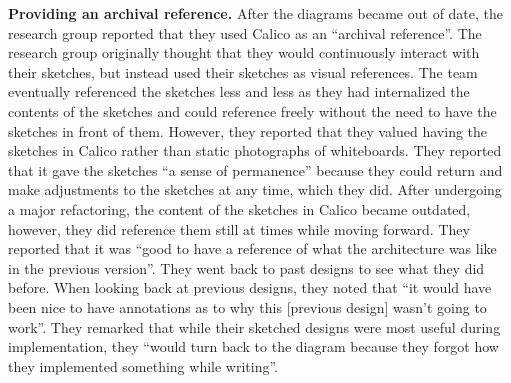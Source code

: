 
\textbf{Providing an archival reference.} After the diagrams became out of date, the research group reported that they used Calico as an ``archival reference''. The research group originally thought that they would continuously interact with their sketches, but instead used their sketches as visual references. The team eventually referenced the sketches less and less as they had internalized the contents of the sketches and could reference freely without the need to have the sketches in front of them. However, they reported that they valued having the sketches in Calico rather than static photographs of whiteboards. They reported that it gave the sketches ``a sense of permanence'' because they could return and make adjustments to the sketches at any time, which they did. After undergoing a major refactoring, the content of the sketches in Calico became outdated, however, they did reference them still at times while moving forward. They reported that it was ``good to have a reference of what the architecture was like in the previous version''. They went back to past designs to see what they did before. When looking back at previous designs, they noted that ``it would have been nice to have annotations as to why this [previous design] wasn't going to work''. They remarked that while their sketched designs were most useful during implementation, they ``would turn back to the diagram because they forgot how they implemented something while writing''.


